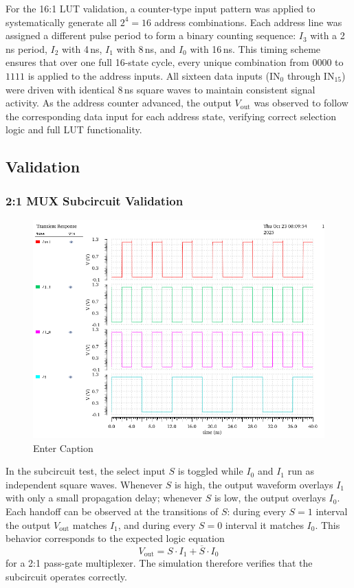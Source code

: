 \documentclass[12pt]{article}
\begin{document}
For the 16:1 LUT validation, a counter-type input pattern was applied to systematically generate all \( 2^4 = 16 \) address combinations. 
Each address line was assigned a different pulse period to form a binary counting sequence: \( I_3 \) with a 2\,ns period, \( I_2 \) with 4\,ns, \( I_1 \) with 8\,ns, and \( I_0 \) with 16\,ns. This timing scheme ensures that over one full 16-state cycle, every unique combination from \( 0000 \) to \( 1111 \) is applied to the address inputs. All sixteen data inputs (\( \text{IN}_0 \) through \( \text{IN}_{15} \)) were driven with identical 8\,ns square waves to maintain consistent signal activity. 
As the address counter advanced, the output \( V_{\text{out}} \) was observed to follow the corresponding data input for each address state, verifying correct selection logic and full LUT functionality.

\subsection{Validation}
\subsubsection*{2:1 MUX Subcircuit Validation}
\begin{figure}[H]
    \centering
    \includegraphics[width=0.5\linewidth]{writeup//figures/muxsubval.png}
    \caption{Enter Caption}
\end{figure}

In the subcircuit test, the select input \( S \) is toggled while \( I_0 \) and \( I_1 \) run as independent square waves. 
Whenever \( S \) is high, the output waveform overlays \( I_1 \) with only a small propagation delay; whenever \( S \) is low, the output overlays \( I_0 \). 
Each handoff can be observed at the transitions of \( S \): during every \( S=1 \) interval the output \( V_{\text{out}} \) matches \( I_1 \), and during every \( S=0 \) interval it matches \( I_0 \). 
This behavior corresponds to the expected logic equation 
\[
V_{\text{out}} = S \cdot I_1 + \overline{S} \cdot I_0
\]
for a 2:1 pass-gate multiplexer. 
The simulation therefore verifies that the subcircuit operates correctly.
\end{document}
